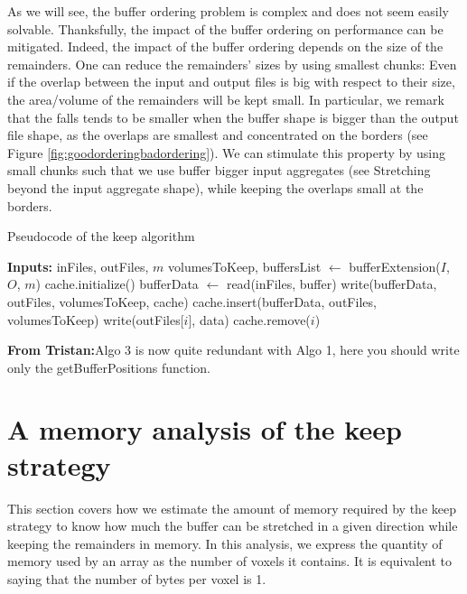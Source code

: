 \documentclass[conference]{IEEEtran}
\newcommand{\tristan}[1]{\color{orange}\textbf{From Tristan:}#1\color{black}}
\begin{document}
As we will see, the buffer ordering problem is complex and does not seem easily
solvable. Thanksfully, the impact of the buffer ordering on performance can be
mitigated. Indeed, the impact of the buffer ordering depends on the size of the
remainders. One can reduce the remainders' sizes by using smallest chunks: Even
if the overlap between the input and output files is big with respect to their
size, the area/volume of the remainders will be kept small. In particular, we
remark that the falls tends to be smaller when the buffer shape is bigger than
the output file shape, as the overlaps are smallest and concentrated on the
borders (see Figure \ref{fig:goodorderingbadordering}). We can stimulate this
property by using small chunks such that we use buffer bigger input aggregates
(see Stretching beyond the input aggregate shape), while keeping the overlaps
small at the borders.

\begin{algorithm}
  \caption{Pseudocode of the keep algorithm}
  \label{algo:keepalgorithm}
  \begin{algorithmic}[1]
    \STATE \textbf{Inputs:} inFiles, outFiles, $m$
    \STATE volumesToKeep, buffersList $\leftarrow$ bufferExtension($I$, $O$, $m$)
    \STATE cache.initialize()
      \STATE bufferData $\leftarrow$ read(inFiles, buffer)
      \STATE write(bufferData, outFiles, volumesToKeep, cache)
      \STATE cache.insert(bufferData, outFiles, volumesToKeep)
          \STATE write(outFiles[$i$], data)
          \STATE cache.remove($i$)
        \ENDIF
      \ENDFOR
    \ENDFOR

  \end{algorithmic}
\end{algorithm}

\tristan{Algo 3 is now quite redundant with Algo 1, here you should write only the getBufferPositions function.}

\section{A memory analysis of the keep strategy}
This section covers how we estimate the amount of memory required by the keep
strategy to know how much the buffer can be stretched in a given direction while
keeping the remainders in memory. In this analysis, we express the quantity of
memory used by an array as the number of voxels it contains. It is equivalent
to saying that the number of bytes per voxel is 1.
\end{document}
